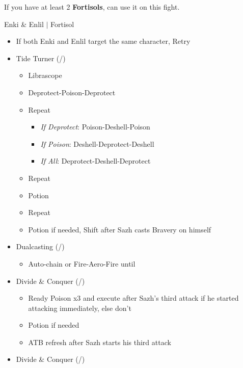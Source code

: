 \documentclass{report}
\begin{document}
\renewcommand{\first}{[1] Slash \& Burn (\rav/\com)}
\renewcommand{\second}{[2] Divide \& Conquer (\sab/\com)}
\renewcommand{\third}{[3] Tide Turner (\sab/\syn)}
\renewcommand{\fourth}{[4] Dualcasting (\rav/\rav)}
\renewcommand{\fifth}{[5] Undermine (\sab/\rav)}
\renewcommand{\sixth}{[6] Divide \& Conquer (\sab/\com)}
\newpage
If you have at least 2 \textbf{Fortisols}, can use it on this fight.
\begin{battle}{Enki \& Enlil $|$ Fortisol}
\begin{multicols}{2}
\begin{itemize}
    \item If both Enki and Enlil target the same character, Retry
    \item \third
    \begin{itemize}
        \item Librascope
        \item Deprotect-Poison-Deprotect
        \item Repeat
        \begin{itemize}
            \item \textit{If Deprotect}: Poison-Deshell-Poison
            \item \textit{If Poison}: Deshell-Deprotect-Deshell
            \item \textit{If All}: Deprotect-Deshell-Deprotect
        \end{itemize}
        \item Repeat
        \item Potion
        \item Repeat
        \item Potion if needed, Shift after Sazh casts Bravery on himself
    \end{itemize}
    \item \fourth
    \begin{itemize}
        \item Auto-chain or Fire-Aero-Fire until \stagger
    \end{itemize}
    \item \sixth
    \begin{itemize}
        \item Ready Poison x3 and execute after Sazh's third attack if he started attacking immediately, else don't
        \item Potion if needed
        \item ATB refresh after Sazh starts his third attack
    \end{itemize}
    \item \second

\end{itemize}
\end{multicols}
\end{battle}
\end{document}
